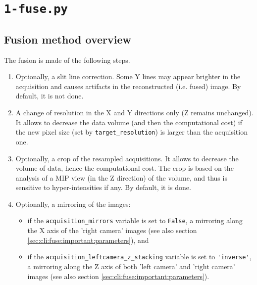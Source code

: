 \section{\texttt{1-fuse.py}}
\label{sec:cli:fuse}

\subsection{Fusion method overview}
\label{sec:cli:fuse:overview}

The fusion is made of the following steps.
\begin{enumerate}
\itemsep -0.5ex
\item \label{it:fusion:slit:line} Optionally, a slit line correction. Some Y lines may appear brighter in the acquisition and causes artifacts in the reconstructed (i.e. fused) image. By default, it is not done.

\item A change of resolution in the X and Y directions only (Z remains unchanged). It allows to decrease the data volume (and then the computational cost) if the new pixel size (set by \verb|target_resolution|) is larger than the acquisition one.

\item \label{it:fusion:crop:1} Optionally, a crop of the resampled acquisitions. It allows to decrease the volume of data, hence the computational cost. The crop is based on the analysis of a MIP view (in the Z direction) of  the volume, and thus is sensitive to hyper-intensities if any. By default, it is done.

\item Optionally, a mirroring of the images:
\begin{itemize}
\item if the \verb|acquisition_mirrors| variable is set to \verb|False|, a mirroring along the X axis of the 'right camera' images (see also section \ref{sec:cli:fuse:important:parameters}), and
\item if the \verb|acquisition_leftcamera_z_stacking| variable is set to \verb|'inverse'|, a mirroring along the Z axis of both 'left camera' and 'right camera' images (see also section \ref{sec:cli:fuse:important:parameters}).
\end{itemize}


\end{enumerate}
